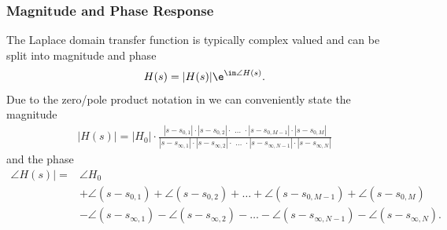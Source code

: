 \subsubsection{Magnitude and Phase Response}
The Laplace domain transfer function is typically complex valued and can be
split into magnitude and phase
\begin{align}
H(s) = |H(s)| \e^{\im \angle H(s)}.
\end{align}
%
Due to the zero/pole product notation in 
we can conveniently state the magnitude
\begin{align}
\label{eq:Hs_H0_z_p_mag}
|H(s)| = |H_0| \cdot \frac
{|s-s_{0,1}| \cdot |s-s_{0,2}| \cdot  \,\,\dots \,\,\cdot  |s-s_{0,M-1}| \cdot  |s-s_{0,M}|}
{|s-s_{\infty,1}| \cdot  |s-s_{\infty,2}| \cdot  \,\,\dots\,\, \cdot |s-s_{\infty,N-1}| \cdot |s-s_{\infty,N}|}
\end{align}
and the phase
\begin{align}
\label{eq:Hs_H0_z_p_phase}
\angle H(s)| =& \angle H_0\\
&
+\angle (s-s_{0,1})
+\angle (s-s_{0,2})
+\dots
+\angle (s-s_{0,M-1})
+\angle (s-s_{0,M})\\
&
-\angle (s-s_{\infty,1})
-\angle (s-s_{\infty,2})
-\dots
-\angle (s-s_{\infty,N-1})
-\angle (s-s_{\infty,N}).
\end{align}



